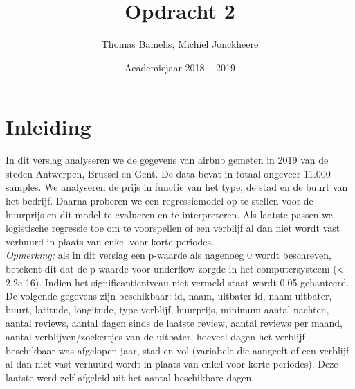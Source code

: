 \documentclass[a4paper,kulak]{kulakarticle} %
\date{Academiejaar 2018 -- 2019}
\title{Opdracht 2}
\author{Thomas Bamelis, Michiel Jonckheere}
\begin{document}
\maketitle

\section*{Inleiding}
In dit verslag analyseren we de gegevens van airbnb gemeten in 2019 van de steden Antwerpen, Brussel en Gent. 
De data bevat in totaal ongeveer 11.000 samples.
We analyseren de prijs in functie van het type, de stad en de buurt van het bedrijf.
Daarna proberen we een regressiemodel op te stellen voor de huurprijs en dit model te evalueren en te interpreteren.
Als laatste passen we logistische regressie toe om te voorspellen of een verblijf al dan niet wordt vast verhuurd in plaats van enkel voor korte periodes.\\
\textit{Opmerking:} als in dit verslag een p-waarde als nagenoeg 0 wordt beschreven, betekent dit dat de p-waarde voor underflow zorgde in het computersysteem (< 2.2e-16).
Indien het significantieniveau niet vermeld staat wordt 0.05 gehanteerd. \\
De volgende gegevens zijn beschikbaar: id, naam, uitbater id, naam uitbater, buurt, latitude, longitude, type verblijf, huurprijs, minimum aantal nachten, aantal reviews, aantal dagen sinds de laatste review, aantal reviews per maand, aantal verblijven/zoekertjes van de uitbater, hoeveel dagen het verblijf beschikbaar was afgelopen jaar, stad en vol (variabele die aangeeft of een verblijf al dan niet vast verhuurd wordt in plaats van enkel voor korte periodes).    
Deze laatste werd zelf afgeleid uit het aantal beschikbare dagen.
\end{document}
